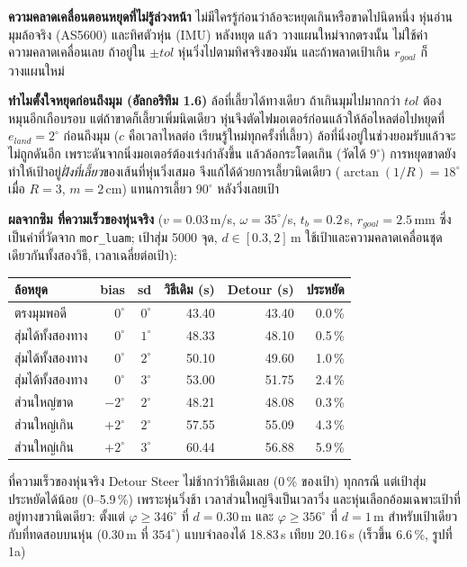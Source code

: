 \documentclass[11pt,a4paper]{article}
\begin{document}
{\noindent\textbf{ความคลาดเคลื่อนตอนหยุดที่ไม่รู้ล่วงหน้า} ไม่มีใครรู้ก่อนว่าล้อจะหยุดเกินหรือขาดไปนิดหนึ่ง
หุ่นอ่านมุมล้อจริง (AS5600) และทิศตัวหุ่น (IMU) หลังหยุด แล้ว \FDetourSteer{} วางแผนใหม่จากตรงนั้น
\FPlan{} ไม่ใช้ค่าความคลาดเคลื่อนเลย ถ้าอยู่ใน $\pm tol$ หุ่นวิ่งไปตามทิศจริงของมัน
และถ้าพลาดเป้าเกิน $r_{goal}$ ก็วางแผนใหม่

\smallskip
\noindent\textbf{ทำไมตั้งใจหยุดก่อนถึงมุม (อัลกอริทึม 1.6)} ล้อที่เลี้ยวได้ทางเดียว ถ้าเกินมุมไปมากกว่า $tol$
ต้องหมุนอีกเกือบรอบ แต่ถ้าขาดก็เลี้ยวเพิ่มนิดเดียว หุ่นจึงตัดไฟมอเตอร์ก่อนแล้วให้ล้อไหลต่อไปหยุดที่
$e_{land} = 2^\circ$ ก่อนถึงมุม ($c$ คือเวลาไหลต่อ เรียนรู้ใหม่ทุกครั้งที่เลี้ยว)
ล้อที่นิ่งอยู่ในช่วงยอมรับแล้วจะไม่ถูกดันอีก เพราะดันจากนิ่งมอเตอร์ต้องเร่งกำลังขึ้น แล้วล้อกระโดดเกิน
(วัดได้ $9^\circ$) การหยุดขาดยังทำให้เป้าอยู่\emph{ฝั่งที่เลี้ยว}ของเส้นที่หุ่นวิ่งเสมอ
\FDriveReaim{} จึงแก้ได้ด้วยการเลี้ยวนิดเดียว ($\arctan(1/R) = 18^\circ$ เมื่อ $R = 3$, $m = 2$\,cm)
แทนการเลี้ยว $90^\circ$ หลังวิ่งเลยเป้า

\smallskip
\noindent\textbf{ผลจากซิม ที่ความเร็วของหุ่นจริง} ($v = 0.03$\,m/s, $\omega = 35^\circ$/s, $t_b = 0.2$\,s,
$r_{goal} = 2.5$\,mm ซึ่งเป็นค่าที่วัดจาก \texttt{mor\_luam}; เป้าสุ่ม 5000 จุด, $d \in [0.3, 2]$\,m
ใช้เป้าและความคลาดเคลื่อนชุดเดียวกันทั้งสองวิธี, เวลาเฉลี่ยต่อเป้า):
\begin{center}
\begin{tabular}{lrrrrr}
\toprule
ล้อหยุด & bias & sd & วิธีเดิม (s) & Detour (s) & ประหยัด \\
\midrule
ตรงมุมพอดี         & $0^\circ$  & $0^\circ$ & 43.40 & 43.40 & 0.0\,\% \\
สุ่มได้ทั้งสองทาง    & $0^\circ$  & $1^\circ$ & 48.33 & 48.10 & 0.5\,\% \\
สุ่มได้ทั้งสองทาง    & $0^\circ$  & $2^\circ$ & 50.10 & 49.60 & 1.0\,\% \\
สุ่มได้ทั้งสองทาง    & $0^\circ$  & $3^\circ$ & 53.00 & 51.75 & 2.4\,\% \\
ส่วนใหญ่ขาด        & $-2^\circ$ & $2^\circ$ & 48.21 & 48.08 & 0.3\,\% \\
ส่วนใหญ่เกิน        & $+2^\circ$ & $2^\circ$ & 57.55 & 55.09 & 4.3\,\% \\
ส่วนใหญ่เกิน        & $+2^\circ$ & $3^\circ$ & 60.44 & 56.88 & 5.9\,\% \\
\bottomrule
\end{tabular}
\end{center}
\noindent ที่ความเร็วของหุ่นจริง Detour Steer ไม่ช้ากว่าวิธีเดิมเลย (0\,\% ของเป้า) ทุกกรณี
แต่เป้าสุ่มประหยัดได้น้อย (0--5.9\,\%) เพราะหุ่นวิ่งช้า เวลาส่วนใหญ่จึงเป็นเวลาวิ่ง
และหุ่นเลือกอ้อมเฉพาะเป้าที่อยู่ทางขวานิดเดียว: ตั้งแต่ $\varphi \ge 346^\circ$ ที่ $d = 0.30$\,m
และ $\varphi \ge 356^\circ$ ที่ $d = 1$\,m
สำหรับเป้าเดียวกับที่ทดสอบบนหุ่น (0.30\,m ที่ $354^\circ$) แบบจำลองได้ 18.83\,s เทียบ 20.16\,s
(เร็วขึ้น 6.6\,\%, รูปที่ 1a)

}
\end{document}
